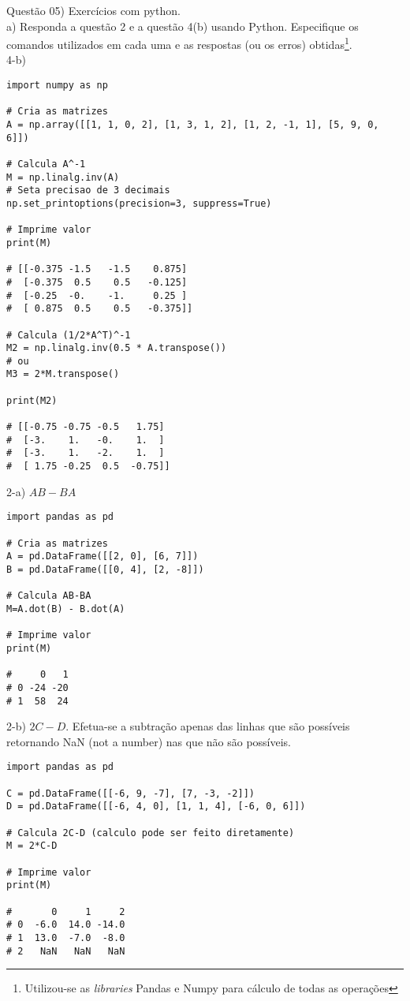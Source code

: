 
\noindent \textcolor{COLOR1}{Questão 05)} Exercícios com python.
\\

a) Responda a questão 2 e a questão 4(b) usando Python. Especifique os comandos utilizados em cada uma e as respostas (ou os erros) obtidas\footnote{Utilizou-se as \textit{libraries} Pandas e Numpy para cálculo de todas as operações}.
\\

4-b)
\\

\begin{lstlisting}
import numpy as np

# Cria as matrizes
A = np.array([[1, 1, 0, 2], [1, 3, 1, 2], [1, 2, -1, 1], [5, 9, 0, 6]])

# Calcula A^-1
M = np.linalg.inv(A)
# Seta precisao de 3 decimais
np.set_printoptions(precision=3, suppress=True)

# Imprime valor
print(M)

# [[-0.375 -1.5   -1.5    0.875]
#  [-0.375  0.5    0.5   -0.125]
#  [-0.25  -0.    -1.     0.25 ]
#  [ 0.875  0.5    0.5   -0.375]]

# Calcula (1/2*A^T)^-1
M2 = np.linalg.inv(0.5 * A.transpose())
# ou
M3 = 2*M.transpose()

print(M2)

# [[-0.75 -0.75 -0.5   1.75]
#  [-3.    1.   -0.    1.  ]
#  [-3.    1.   -2.    1.  ]
#  [ 1.75 -0.25  0.5  -0.75]]
\end{lstlisting}


2-a) $AB-BA$
\\

\begin{lstlisting}
import pandas as pd

# Cria as matrizes
A = pd.DataFrame([[2, 0], [6, 7]])
B = pd.DataFrame([[0, 4], [2, -8]])

# Calcula AB-BA
M=A.dot(B) - B.dot(A)

# Imprime valor
print(M)

#     0   1
# 0 -24 -20
# 1  58  24
\end{lstlisting}


2-b) $2C-D$. Efetua-se a subtração apenas das linhas que são possíveis retornando NaN (not a number) nas que não são possíveis.
\\

\begin{lstlisting}
import pandas as pd

C = pd.DataFrame([[-6, 9, -7], [7, -3, -2]])
D = pd.DataFrame([[-6, 4, 0], [1, 1, 4], [-6, 0, 6]])

# Calcula 2C-D (calculo pode ser feito diretamente)
M = 2*C-D

# Imprime valor
print(M)

#       0     1     2
# 0  -6.0  14.0 -14.0
# 1  13.0  -7.0  -8.0
# 2   NaN   NaN   NaN
\end{lstlisting}

